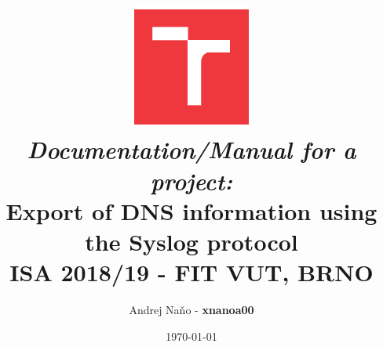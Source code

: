 \documentclass[a4paper,11pt]{article}
\title{\includegraphics[width=4.1cm,keepaspectratio,trim={1.2cm 1.2cm 1.2cm 1.2cm},clip]{vut} \\
\vspace{4cm}
\textit{Documentation/Manual for a project:} \\
\textbf{Export of DNS information using the Syslog protocol}\\
\vspace{0.5cm}
\textsc{ISA 2018/19 - FIT VUT, BRNO}}
\author{Andrej Naňo - \textbf{xnanoa00}}
\date{\today}
\begin{document}
\newpage
\maketitle
\newpage


\renewcommand{\contentsname}{Table of Content}
\tableofcontents







\end{document}
